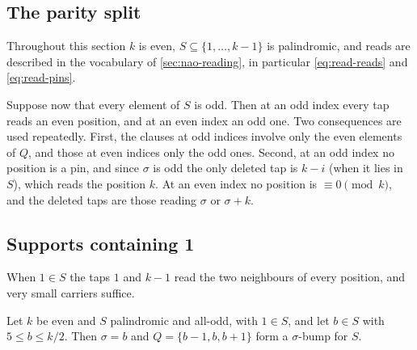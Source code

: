 \subsection{The parity split}
\label{sec:allodd-parity}

Throughout this section $k$ is even, $S\subseteq\{1,\dots,k-1\}$ is
palindromic, and reads are described in the vocabulary of
\autoref{sec:nao-reading}, in particular \eqref{eq:read-reads} and
\eqref{eq:read-pins}.

Suppose now that every element of $S$ is odd. Then at an odd index every tap
reads an even position, and at an even index an odd one. Two consequences are
used repeatedly. First, the clauses at odd indices involve only the even
elements of $Q$, and those at even indices only the odd ones. Second, at an
odd index no position is a pin, and since $\sigma$ is odd the only deleted tap
is $k-i$ (when it lies in $S$), which reads the position $k$. At an even index
no position is $\equiv0\pmod k$, and the deleted taps are those reading
$\sigma$ or $\sigma+k$.

\subsection{Supports containing 1}
\label{sec:allodd-one}

When $1\in S$ the taps $1$ and $k-1$ read the two neighbours of every
position, and very small carriers suffice.

\begin{lemma}
\label{lem:allodd-mid}
Let $k$ be even and $S$ palindromic and all-odd, with $1\in S$, and let $b\in S$
with $5\le b\le k/2$. Then $\sigma=b$ and $Q=\{b-1,b,b+1\}$ form a $\sigma$-bump
for $S$.
\end{lemma}


